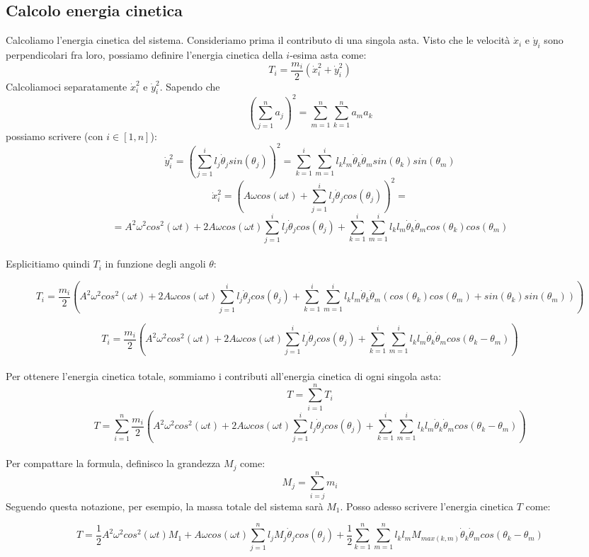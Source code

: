 \documentclass[12pt, a4paper] {article}
\begin{document}
\subsection{Calcolo energia cinetica}
Calcoliamo l'energia cinetica del sistema. Consideriamo prima il contributo di una singola asta. Visto che le velocità $\dot x_i$ e $\dot y_i$ sono perpendicolari fra  loro, possiamo definire l'energia cinetica della $i$-esima asta come: \[T_i=\frac{m_i}{2}(\dot x_i^2+\dot y_i^2)\]
Calcoliamoci separatamente $\dot x_i^2$ e $\dot y_i^2$. 
Sapendo che \[(\sum_{j=1}^{n}a_j)^2=\sum_{m=1}^{n}\sum_{k=1}^{n}a_ma_k\]
possiamo scrivere (con $i\in[1,n]$):
\[\dot y_i^2=(\sum_{j=1}^{i}l_j\dot\theta_j sin(\theta_j))^2=\sum_{k=1}^{i}\sum_{m=1}^{i}l_kl_m\dot\theta_k \dot\theta_m sin(\theta_k)sin(\theta_m)\]
\[\dot x_i^2=(A\omega cos(\omega t)+\sum_{j=1}^{i}l_j\dot\theta_j cos(\theta_j))^2=\]
\[=A^2\omega ^2 cos^2 (\omega t)+2A\omega cos(\omega t)\sum_{j=1}^{i}l_j\dot\theta_jcos(\theta_j)+\sum_{k=1}^{i}\sum_{m=1}^{i}l_kl_m\dot\theta_k \dot\theta_m cos(\theta_k)cos(\theta_m)\]
\\Esplicitiamo quindi $T_i$ in funzione degli angoli $\theta$:
\begin{adjustwidth}{-2.00cm}{}
\[T_i=\frac{m_i}{2}(A^2\omega^2cos^2(\omega t)+2A\omega cos(\omega t)\sum_{j=1}^{i}l_j\dot\theta_jcos(\theta_j)+\sum_{k=1}^{i}\sum_{m=1}^{i}l_kl_m\dot\theta_k \dot\theta_m (cos(\theta_k)cos(\theta_m)+sin(\theta_k)sin(\theta_m)))\]
\end{adjustwidth}
\[T_i=\frac{m_i}{2}(A^2\omega^2cos^2(\omega t)+2A\omega cos(\omega t)\sum_{j=1}^{i}l_j\dot\theta_jcos(\theta_j)+\sum_{k=1}^{i}\sum_{m=1}^{i}l_kl_m\dot\theta_k \dot\theta_m cos(\theta_k-\theta_m))\]
\\Per ottenere l'energia cinetica totale, sommiamo i contributi all'energia cinetica di ogni singola asta:
\[T=\sum_{i=1}^{n}T_i\]
\[T=\sum_{i=1}^{n}\frac{m_i}{2}(A^2\omega^2cos^2(\omega t)+2A\omega cos(\omega t)\sum_{j=1}^{i}l_j\dot\theta_jcos(\theta_j)+\sum_{k=1}^{i}\sum_{m=1}^{i}l_kl_m\dot\theta_k \dot\theta_m cos(\theta_k-\theta_m))\]\\
Per compattare la formula, definisco la grandezza $M_j$ come:
\[M_j=\sum_{i=j}^{n}m_i\]
Seguendo questa notazione, per esempio, la massa totale del sistema sarà $M_1$. Posso adesso scrivere l'energia cinetica $T$ come:
\begin{adjustwidth}{-1.40cm}{}
\[T=\frac{1}{2}A^2\omega^2cos^2(\omega t)M_1+A\omega cos(\omega t)\sum_{j=1}^{n}l_jM_j\dot\theta_jcos(\theta_j)+\frac{1}{2}\sum_{k=1}^{n}\sum_{m=1}^{n}l_kl_m M_{max(k,m)}\dot\theta_k \dot\theta_m cos(\theta_k-\theta_m)\]\\
\end{adjustwidth}
\end{document}
